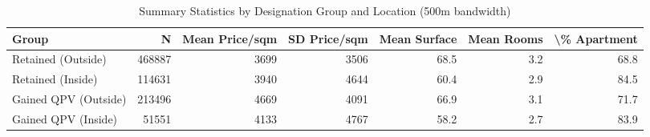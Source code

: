 \begin{table}

\caption{Summary Statistics by Designation Group and Location (500m bandwidth)}
\centering
\begin{tabular}[t]{lrrrrrr}
\toprule
Group & N & Mean Price/sqm & SD Price/sqm & Mean Surface & Mean Rooms & \textbackslash{}\% Apartment\\
\midrule
Retained (Outside) & 468887 & 3699 & 3506 & 68.5 & 3.2 & 68.8\\
Retained (Inside) & 114631 & 3940 & 4644 & 60.4 & 2.9 & 84.5\\
Gained QPV (Outside) & 213496 & 4669 & 4091 & 66.9 & 3.1 & 71.7\\
Gained QPV (Inside) & 51551 & 4133 & 4767 & 58.2 & 2.7 & 83.9\\
\bottomrule
\end{tabular}
\end{table}
